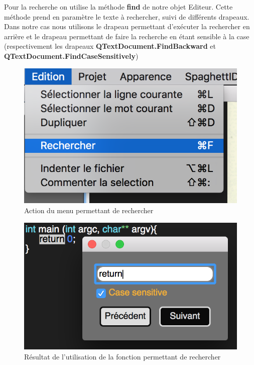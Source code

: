 \documentclass[a4paper,12pt]{article}
\begin{document}
	Pour la recherche on utilise la méthode \textbf{find} de notre objet Editeur. Cette méthode prend en paramètre le texte à rechercher, suivi de différents drapeaux. Dans notre cas nous utilisons le drapeau permettant d'exécuter la rechercher en arrière et le drapeau permettant de faire la recherche en étant sensible à la case (respectivement les drapeaux \textbf{QTextDocument.FindBackward} et \textbf{QTextDocument.FindCaseSensitively})

	\begin{figure}[h!]
		\begin{center}
			\includegraphics[scale=0.8]{images/imgs_edit/utilisation_rechercher}
			\caption{Action du menu permettant de rechercher}
		\end{center}
	\end{figure}

	\begin{figure}[h!]
		\begin{center}
			\includegraphics[scale=0.8]{images/imgs_edit/resultat_rechercher}
			\caption{Résultat de l'utilisation de la fonction permettant de rechercher}
		\end{center}
	\end{figure}
	\newpage
\end{document}
